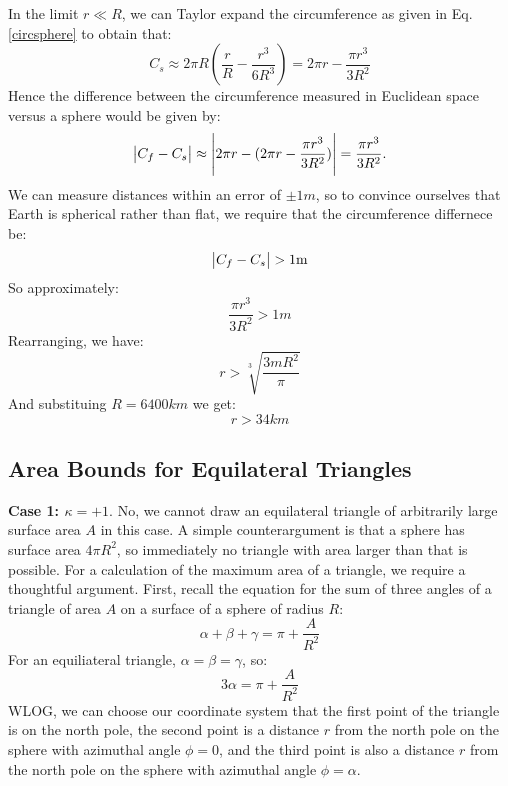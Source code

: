 In the limit $r \ll R$, we can Taylor expand the circumference as given in Eq. \eqref{circsphere} to obtain that:
\begin{equation}
    C_s \approx 2\pi R\left(\frac{r}{R} - \frac{r^3}{6R^3}\right) = 2\pi r - \frac{\pi r^3}{3R^2}
\end{equation}
Hence the difference between the circumference measured in Euclidean space versus a sphere would be given by:
\begin{equation}
    \abs{C_f - C_s} \approx \abs{2\pi r - (2\pi r - \frac{\pi r^3}{3R^2})} = \frac{\pi r^3}{3R^2}.
\end{equation}
We can measure distances within an error of $\pm 1\si{m}$, so to convince ourselves that Earth is spherical rather than flat, we require that the circumference differnece be:
\begin{equation}
    \abs{C_f - C_s} > 1\si{m}
\end{equation}
So approximately:
\begin{equation}
    \frac{\pi r^3}{3R^2} > 1 \si{m}
\end{equation}
Rearranging, we have:
\begin{equation}
    r > \sqrt[3]{\frac{3\si{m} R^2}{\pi}}
\end{equation}
And substituing $R = 6400\si{km}$ we get:
\begin{equation}
    \boxed{r > 34\si{km}}
\end{equation}

\subsection{Area Bounds for Equilateral Triangles}
\textbf{Case 1: $\kappa = +1$}. No, we cannot draw an equilateral triangle of arbitrarily large surface area $A$ in this case. A simple counterargument is that a sphere has surface area $4\pi R^2$, so immediately no triangle with area larger than that is possible. For a calculation of the maximum area of a triangle, we require a thoughtful argument. First, recall the equation for the sum of three angles of a triangle of area $A$ on a surface of a sphere of radius $R$:
\begin{equation}
    \alpha + \beta + \gamma  = \pi + \frac{A}{R^2}
\end{equation}
For an equiliateral triangle, $\alpha = \beta = \gamma$, so:
\begin{equation}\label{sphereangles}
    3\alpha = \pi + \frac{A}{R^2}
\end{equation}
WLOG, we can choose our coordinate system that the first point of the triangle is on the north pole, the second point is a distance $r$ from the north pole on the sphere with azimuthal angle $\phi = 0$, and the third point is also a distance $r$ from the north pole on the sphere with azimuthal angle $\phi = \alpha$.

